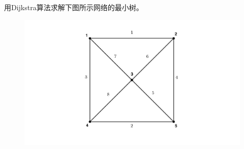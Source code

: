 \documentclass[lang = cn, scheme = chinese, thmcnt = section]{elegantbook}
\begin{document}
\begin{example}
	用Dijkstra算法求解下图所示网络的最小树。
	\begin{figure}[H]
		\centering
		\includegraphics[scale = 0.15]{../图/12.1.1}
	\end{figure}
\end{example}
\end{document}
